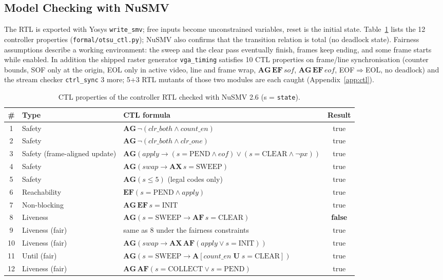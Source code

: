 \documentclass[11pt,a4paper]{article}
\begin{document}
\subsection{Model Checking with NuSMV}
The RTL is exported with Yosys \texttt{write\_smv}; free inputs become unconstrained variables, reset is the initial state.
Table~\ref{tab:ctl} lists the 12 controller properties (\texttt{formal/otsu\_ctl.py}); NuSMV also confirms that the transition
relation is total (no deadlock state). Fairness assumptions describe a working environment: the sweep and the clear pass eventually
finish, frames keep ending, and some frame starts while enabled. In addition the shipped raster generator \texttt{vga\_timing}
satisfies 10 CTL properties on frame/line synchronisation (counter bounds, SOF only at the origin, EOL only in active video, line
and frame wrap, $\mathbf{AG\,EF}\,\mathit{sof}$, $\mathbf{AG\,EF}\,\mathit{eof}$, EOF$\Rightarrow$EOL, no deadlock) and the stream checker
\texttt{ctrl\_sync} 3 more; 5+3 RTL mutants of those two modules are each caught (Appendix~\ref{app:ctl}).
\begin{table}[H]\centering\footnotesize
\caption{CTL properties of the controller RTL checked with NuSMV 2.6 (s = \texttt{state}).}\label{tab:ctl}
\setlength{\tabcolsep}{4pt}
\begin{tabularx}{\linewidth}{@{}clXc@{}}
\toprule
\# & Type & CTL formula & Result\\
\midrule
1 & Safety & $\mathbf{AG}\,\neg(\mathit{clr\_both}\wedge\mathit{count\_en})$ & true\\
2 & Safety & $\mathbf{AG}\,\neg(\mathit{clr\_both}\wedge\mathit{clr\_one})$ & true\\
3 & Safety (frame-aligned update) & $\mathbf{AG}(\mathit{apply}\rightarrow(s{=}\text{PEND}\wedge\mathit{eof})\vee(s{=}\text{CLEAR}\wedge\neg\mathit{px}))$ & true\\
4 & Safety & $\mathbf{AG}(\mathit{swap}\rightarrow\mathbf{AX}\,s{=}\text{SWEEP})$ & true\\
5 & Safety & $\mathbf{AG}(s\le 5)$ (legal codes only) & true\\
6 & Reachability & $\mathbf{EF}(s{=}\text{PEND}\wedge\mathit{apply})$ & true\\
7 & Non-blocking & $\mathbf{AG\,EF}\,s{=}\text{INIT}$ & true\\
8 & Liveness & $\mathbf{AG}(s{=}\text{SWEEP}\rightarrow\mathbf{AF}\,s{=}\text{CLEAR})$ & \textbf{false}\\
9 & Liveness (fair) & same as 8 under the fairness constraints & true\\
10 & Liveness (fair) & $\mathbf{AG}(\mathit{swap}\rightarrow\mathbf{AX\,AF}(\mathit{apply}\vee s{=}\text{INIT}))$ & true\\
11 & Until (fair) & $\mathbf{AG}(s{=}\text{SWEEP}\rightarrow\mathbf{A}[\mathit{count\_en}\;\mathbf{U}\;s{=}\text{CLEAR}])$ & true\\
12 & Liveness (fair) & $\mathbf{AG\,AF}(s{=}\text{COLLECT}\vee s{=}\text{PEND})$ & true\\
\bottomrule
\end{tabularx}
\end{table}
\end{document}
